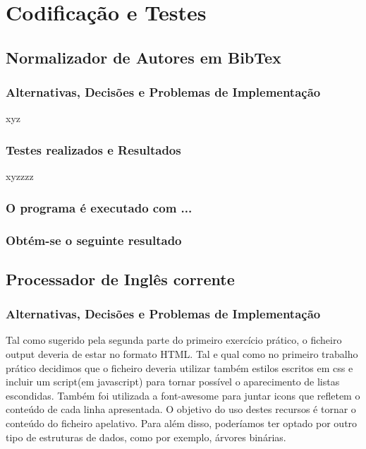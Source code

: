 \documentclass{report}
\begin{document}
\chapter{Codificação e Testes} \label{ct}

\section{Normalizador de Autores em BibTex}

\subsection{Alternativas, Decisões e Problemas de Implementação}
xyz

\subsection{Testes realizados e Resultados}
xyzzzz

\subsection{O programa é executado com ...}


\subsection{Obtém-se o seguinte resultado}

\section{Processador de Inglês corrente}

\subsection{Alternativas, Decisões e Problemas de Implementação}
Tal como sugerido pela segunda parte do primeiro exercício prático, 
o ficheiro output deveria de estar no formato HTML. Tal e qual como 
no primeiro trabalho prático decidimos que o ficheiro deveria utilizar 
também estilos escritos em css e incluir um script(em javascript) para 
tornar possível o aparecimento de listas escondidas. 
Também foi utilizada a font-awesome para juntar icons que refletem o 
conteúdo de cada linha apresentada. O objetivo do uso destes recursos é 
tornar o conteúdo do ficheiro apelativo. Para além disso, poderíamos ter 
optado por outro tipo de estruturas de dados, como por exemplo, árvores binárias. 
\end{document}
